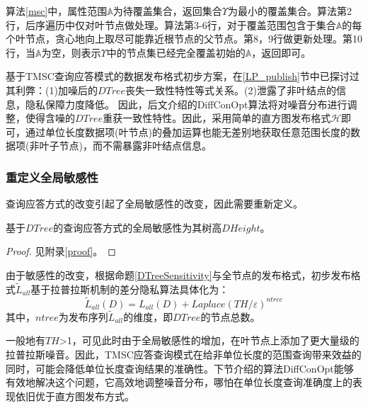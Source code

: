 算法\ref{msc}中，属性范围$\mathbb{A}$为待覆盖集合，返回集合$\Upsilon$为最小的覆盖集合。算法第2行，后序遍历中仅对叶节点做处理。算法第3-6行，对于覆盖范围包含于集合$\mathbb{A}$的每个叶节点，贪心地向上取尽可能靠近根节点的父节点。第8，9行做更新处理。第10行，当$\mathbb{A}$为空，则表示$\Upsilon$中的节点集已经完全覆盖初始的$\mathbb{A}$，返回即可。

基于TMSC查询应答模式的数据发布格式初步方案，在\ref{LP_publish}节中已探讨过其利弊：(1)加噪后的$DTree$丧失一致性特性等式关系。(2)泄露了非叶结点的信息，隐私保障力度降低。
因此，后文介绍的DiffConOpt算法将对噪音分布进行调整，使得含噪的$DTree$重获一致性特性。因此，采用简单的直方图发布格式$\mathcal{H}$即可，通过单位长度数据项(叶节点)的叠加运算也能无差别地获取任意范围长度的数据项(非叶子节点)，而不需暴露非叶结点信息。

\subsubsection{重定义全局敏感性}

查询应答方式的改变引起了全局敏感性的改变，因此需要重新定义。

\begin{prop}
	\label{DTreeSensitivity}
	基于$DTree$的查询应答方式的全局敏感性为其树高$DHeight$。
\end{prop}
\begin{proof}
	见附录\ref{proof}。
\end{proof}

由于敏感性的改变，根据命题\ref{DTreeSensitivity}与全节点的发布格式，初步发布格式$\tilde{L}_{all}$基于拉普拉斯机制的差分隐私算法具体化为：
\begin{equation}
\label{chap4_dtree}
\tilde{L}_{all}(D) = L_{all}(D) + \textit{Laplace}(TH/\varepsilon)^{ntree}
\end{equation}
其中，$ntree$为发布序列$\tilde{L}_{all}$的维度，即$DTree$的节点总数。

一般地有$TH$>1，可见此时由于全局敏感性的增加，在叶节点上添加了更大量级的拉普拉斯噪音。因此，TMSC应答查询模式在给非单位长度的范围查询带来效益的同时，可能会降低单位长度查询结果的准确性。下节介绍的算法DiffConOpt能够有效地解决这个问题，它高效地调整噪音分布，哪怕在单位长度查询准确度上的表现依旧优于直方图发布方式。




